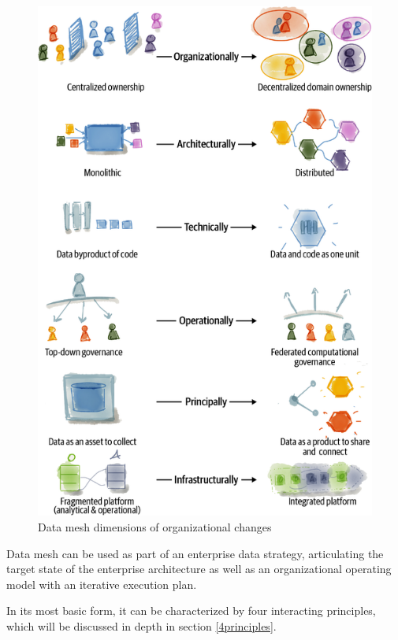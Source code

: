 \documentclass[12pt, a4paper]{book}
\begin{document}
\begin{figure}[h]
	\begin{framed}
		\centering
		\includegraphics[width=14cm]{OrgChanges.png}
		\caption{Data mesh dimensions of organizational changes}
		\label{orgchange}
	\end{framed}
\end{figure}

Data mesh can be used as part of an enterprise data strategy, articulating the target state of the enterprise architecture as well as an organizational operating model with an iterative execution plan.

In its most basic form, it can be characterized by four interacting principles, which will be discussed in depth in section \ref{4principles}.
\end{document}
